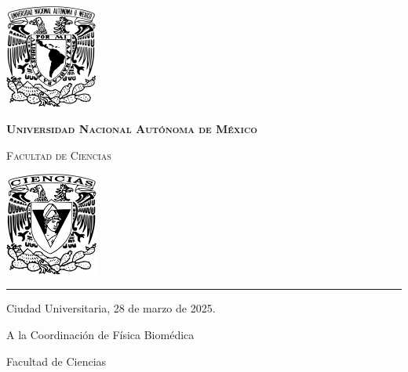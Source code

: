 \documentclass[9pt,letterpaper]{article}
\begin{document}
	
	
	\begin{center}
		\begin{minipage}{3cm}
			\begin{center}
				\includegraphics[height=3.4cm]{Logo_UNAM (1)}
			\end{center}
		\end{minipage}\hfill
		\begin{minipage}{10cm}
			\begin{center}
				{\scshape\LARGE \textbf{Universidad Nacional Autónoma de México} \par}
				{\scshape\Large Facultad de Ciencias\par}
			\end{center}
		\end{minipage}\hfill
		\begin{minipage}{3cm}
			\begin{center}
				\includegraphics[height=3.4cm]{Logo_FC (1)}
			\end{center}
		\end{minipage}
	\end{center}
	
	\rule{17cm}{0.1mm}
	
	\hspace{0.5cm}
	
	\parbox{\textwidth}{\raggedleft Ciudad Universitaria, 28 de marzo de 2025.}
	
	\hspace{1cm}
	
	\vspace{0.5cm}
	
	A la Coordinación de Física Biomédica
	
	Facultad de Ciencias
	
\end{document}
